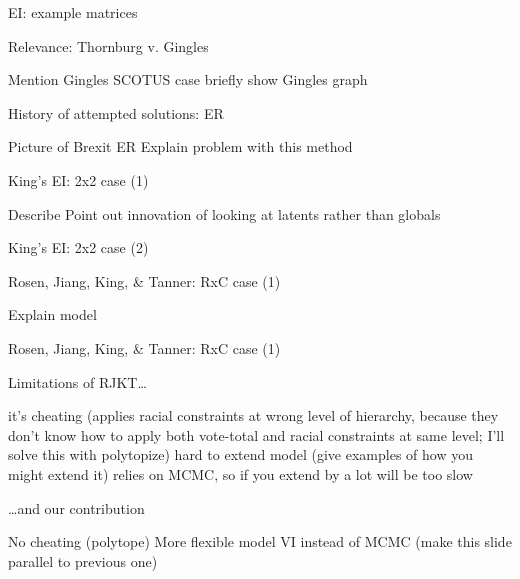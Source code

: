\documentclass[ignorenonframetext,]{beamer}
\begin{document}
\begin{frame}{EI: example matrices}

\end{frame}

\begin{frame}{Relevance: Thornburg v. Gingles}

Mention Gingles SCOTUS case briefly show Gingles graph

\end{frame}

\begin{frame}{History of attempted solutions: ER}

Picture of Brexit ER Explain problem with this method

\end{frame}

\begin{frame}{King's EI: 2x2 case (1)}

Describe Point out innovation of looking at latents rather than globals

\end{frame}

\begin{frame}{King's EI: 2x2 case (2)}

\end{frame}

\begin{frame}{Rosen, Jiang, King, \& Tanner: RxC case (1)}

Explain model

\end{frame}

\begin{frame}{Rosen, Jiang, King, \& Tanner: RxC case (1)}

\end{frame}

\begin{frame}{Limitations of RJKT\ldots{}}

it's cheating (applies racial constraints at wrong level of hierarchy,
because they don't know how to apply both vote-total and racial
constraints at same level; I'll solve this with polytopize) hard to
extend model (give examples of how you might extend it) relies on MCMC,
so if you extend by a lot will be too slow

\end{frame}

\begin{frame}{\ldots{}and our contribution}

No cheating (polytope) More flexible model VI instead of MCMC (make this
slide parallel to previous one)

\end{frame}
\end{document}
